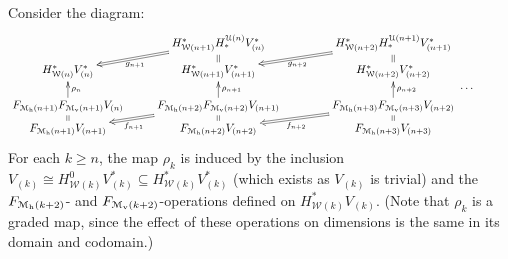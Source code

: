 \documentclass[11pt]{amsart}
\theoremstyle{plain}
\theoremstyle{definition}
\newcommand{\calW}{\mathcal{W}}
\newcommand{\calU}{\mathcal{U}}
\newcommand{\calM}{\mathcal{M}}
\theoremstyle{plain}
\begin{document}
\begin{Calculations of HWn for n nonzero}
Consider the diagram:
\[\xymatrix@R=1.5mm{
&
H^*_{\calW({n+1})}H_*^{\calU(n)}V^*_{(n)}\ar@{=>}[dl]^-{g_{n+1}}\ar@{=}[d]&
H^*_{\calW({n+2})}H_*^{\calU({n+1})}V^*_{({n+1})}\ar@{=>}[dl]^-{g_{n+2}}\ar@{=}[d]&
\\
 H_{\calW(n)}^{*}V^{*}_{(n)}
&H_{\calW({n+1})}^{*}V^{*}_{({n+1})}
&H_{\calW({n+2})}^{*}V^{*}_{({n+2})}
\\
&&\makebox[5cm][r]{\,$\smash{\cdots }$}
\\
 F_{\calM_{\textup{h}}({n+1})}F_{\calM_{\textup{v}}({n+1})}V_{(n)}\ar[uu]_-{\rho_n}\ar@{=}[d]
&F_{\calM_{\textup{h}}({n+2})}F_{\calM_{\textup{v}}({n+2})}V_{({n+1})}\ar[uu]_-{\rho_{n+1}}\ar@{=}[d]\ar@{=>}[ld]^-{f_{n+1}}
&F_{\calM_{\textup{h}}({n+3})}F_{\calM_{\textup{v}}({n+3})}V_{({n+2})}\ar[uu]_-{\rho_{n+2}}\ar@{=}[d]\ar@{=>}[ld]^-{f_{n+2}}
\\
 F_{\calM_\textup{h}({n+1})}V_{({n+1})}
&F_{\calM_\textup{h}({n+2})}V_{({n+2})}
&F_{\calM_\textup{h}({n+3})}V_{({n+3})}
}\]
For each $k\geq n$, the map $\rho_k$ is induced by the inclusion $V_{(k)}\cong H^{0}_{\calW(k)}V_{(k)}^*\subseteq H^{*}_{\calW(k)}V_{(k)}^*$ (which exists as $V_{(k)}$ is trivial) and the $F_{\calM_\textup{h}(k+2)}$- and $F_{\calM_\textup{v}(k+2)}$-operations defined on $H^{*}_{\calW(k)}V_{(k)}$. (Note that $\rho_{k}$ is a graded map, since the effect of these operations on dimensions is the same in its domain and codomain.)


\end{Calculations of HWn for n nonzero}
\end{document}
